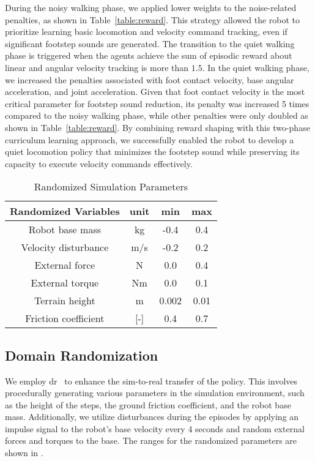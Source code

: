 During the noisy walking phase, we applied lower weights to the noise-related penalties, as shown in Table~\ref{table:reward}. This strategy allowed the robot to prioritize learning basic locomotion and velocity command tracking, even if significant footstep sounds are generated. 
The transition to the quiet walking phase is triggered when the agents achieve the sum of episodic reward about linear and angular velocity tracking is more than $1.5$.
In the quiet walking phase, we increased the penalties associated with foot contact velocity, base angular acceleration, and joint acceleration.  
Given that foot contact velocity is the most critical parameter for footstep sound reduction, its penalty was increased 5 times compared to the noisy walking phase, while other penalties were only doubled as shown in Table~\ref{table:reward}. 
By combining reward shaping with this two-phase curriculum learning approach, we successfully enabled the robot to develop a quiet locomotion policy that minimizes the footstep sound while preserving its capacity to execute velocity commands effectively.

\begin{table}[!t]
\caption{Randomized Simulation Parameters}
\label{table:domainrandomizationparameters}
\begin{center}
\begin{tabular}{cccc}
\toprule
\textbf{Randomized Variables} & \textbf{unit} & \textbf{min} & \textbf{max} \\
\midrule
Robot base mass & kg & -0.4 & 0.4 \\
Velocity disturbance & m/s & -0.2 & 0.2 \\
External force & N & 0.0 & 0.4 \\
External torque & Nm & 0.0 & 0.1 \\
Terrain height & m & 0.002 & 0.01 \\
Friction coefficient & [-] & 0.4 & 0.7 \\
\bottomrule
\end{tabular}
\end{center}
\end{table}

\subsection{Domain Randomization}
We employ \ac{dr}~\cite{domainrandomization1} to enhance the sim-to-real transfer of the policy. This involves procedurally generating various parameters in the simulation environment, such as the height of the steps, the ground friction coefficient, and the robot base mass. Additionally, we utilize disturbances during the episodes by applying an impulse signal to the robot’s base velocity every 4 seconds and random external forces and torques to the base. The ranges for the randomized parameters are shown in .

